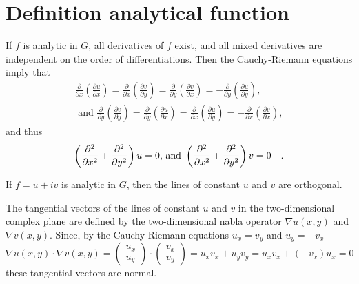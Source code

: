  \section{Definition analytical function}
{\color{OliveGreen}
\bproof
If $f$ is analytic in $G$, all derivatives of $f$ exist, and all mixed derivatives are independent on the order of differentiations.
Then the  Cauchy-Riemann equations  imply that
\begin{equation}
\begin{split}
\frac{\partial }{\partial x}\left(\frac{\partial u}{\partial x}\right)=
\frac{\partial }{\partial x}\left(\frac{\partial v}{\partial y}\right)=
\frac{\partial }{\partial y}\left(\frac{\partial v}{\partial x}\right)=
 -\frac{\partial }{\partial y}\left(\frac{\partial u}{\partial y}\right),     \\
\textrm{ and }\frac{\partial }{\partial y}\left(\frac{\partial v}{\partial y}\right)=
\frac{\partial }{\partial y}\left(\frac{\partial u}{\partial x}\right)=
\frac{\partial }{\partial x}\left(\frac{\partial u}{\partial y}\right)=
-\frac{\partial }{\partial x}\left(\frac{\partial v}{\partial x}\right)
,
\end{split}
\end{equation}
and thus
\eproof
}
\begin{equation}
 \left({\partial^2\over \partial x^2}
 + {\partial^2\over \partial y^2}\right)u=0      \textrm{, and }
 \left({\partial^2\over \partial x^2}
 + {\partial^2\over \partial y^2}\right)v=0\quad .
 \end{equation}


 If $f=u+iv$ is analytic in $G$, then the lines of constant $u$ and $v$ are orthogonal.

 {\color{OliveGreen}
\bproof
 The tangential vectors of the lines of constant $u$ and $v$ in the two-dimensional complex plane are defined by the two-dimensional nabla operator
$\nabla u(x,y)$ and $\nabla v(x,y)$.
Since, by the  Cauchy-Riemann equations $u_x=v_y$ and $u_y=-v_x$
\begin{equation}
\nabla u(x,y)\cdot \nabla v(x,y)
=
\left(
\begin{array}{c}
u_x\\
u_y
\end{array}
\right)
\cdot
\left(
\begin{array}{c}
v_x\\
v_y
\end{array}
\right)
=  u_x  v_x + u_y v_y   =   u_x  v_x  + (-v_x) u_x =0
\end{equation}
these tangential vectors are normal.
\eproof
}


